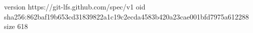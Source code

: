 version https://git-lfs.github.com/spec/v1
oid sha256:862baf19b653cd31839822a1c19c2ecda4583b420a23cae001bfd7975a612288
size 618
